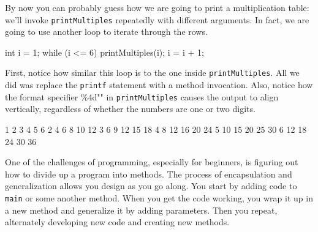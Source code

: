 \documentclass[12pt]{book}
\makeatletter
\theoremstyle{exercise}
\newcommand{\java}[1]{\verb"#1"}
\renewcommand{\section}{\@startsection{section}{1}{\z@}%
    {-3.5ex \@plus -1ex \@minus -.2ex}%
    {0.7ex \@plus.2ex}%
    {\normalfont\Large\bfseries}}
\newcommand{\java}[1]{\lstinline{#1}} %
\makeatother
\begin{document}
By now you can probably guess how we are going to print a multiplication table: we'll invoke \java{printMultiples} repeatedly with different arguments.
In fact, we are going to use another loop to iterate through the rows.

\begin{code}
    int i = 1;
    while (i <= 6) {
        printMultiples(i);
        i = i + 1;
    }
\end{code}

First, notice how similar this loop is to the one inside \java{printMultiples}.
All we did was replace the \java{printf} statement with a method invocation.
Also, notice how the format specifier \java{"\%4d"} in \java{printMultiples} causes the output to align vertically, regardless of whether the numbers are one or two digits.

\begin{stdout}
    1    2    3    4    5    6
    2    4    6    8   10   12
    3    6    9   12   15   18
    4    8   12   16   20   24
    5   10   15   20   25   30
    6   12   18   24   30   36
\end{stdout}

%
%

One of the challenges of programming, especially for beginners, is figuring out how to divide up a program into methods.
The process of encapsulation and generalization allows you design as you go along.
You start by adding code to \java{main} or some another method.
When you get the code working, you wrap it up in a new method and generalize it by adding parameters.
Then you repeat, alternately developing new code and creating new methods.
\end{document}
